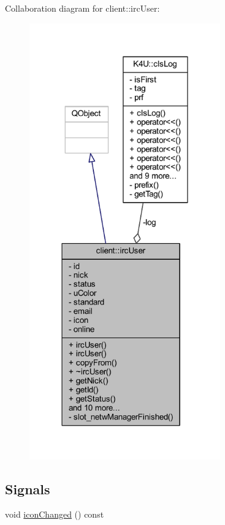 Collaboration diagram for client\-:\-:irc\-User\-:\nopagebreak
\begin{figure}[H]
\begin{center}
\leavevmode
\includegraphics[width=233pt]{df/d07/classclient_1_1irc_user__coll__graph}
\end{center}
\end{figure}
\subsection*{Signals}
\begin{DoxyCompactItemize}
\item 
void \hyperlink{classclient_1_1irc_user_a80f421ad537905c9bb6b3ecca9356984}{icon\-Changed} () const 
\end{DoxyCompactItemize}
